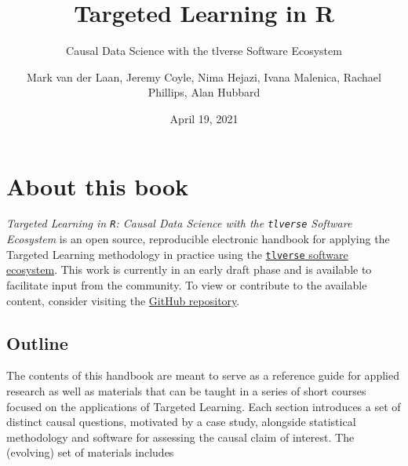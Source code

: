 \documentclass[12pt, krantz2,]{krantz}
\title{Targeted Learning in R}
\subtitle{Causal Data Science with the tlverse Software Ecosystem}
\author{Mark van der Laan, Jeremy Coyle, Nima Hejazi, Ivana Malenica, Rachael Phillips, Alan Hubbard}
\date{April 19, 2021}
\theoremstyle{definition}
\theoremstyle{definition}
\theoremstyle{definition}
\newcommand{\1}{\mathbbm{1}}
\begin{document}
\maketitle


\thispagestyle{empty}

\begin{center}
\end{center}

\setlength{\abovedisplayskip}{-5pt}
\setlength{\abovedisplayshortskip}{-5pt}

\mainmatter

{
\hypersetup{linkcolor=}
\setcounter{tocdepth}{3}
\tableofcontents
}
\listoftables
\listoffigures
\hypertarget{about-this-book}{%
\section*{About this book}\label{about-this-book}}


\emph{Targeted Learning in \texttt{R}: Causal Data Science with the \texttt{tlverse} Software
Ecosystem} is an open source, reproducible electronic handbook for applying the
Targeted Learning methodology in practice using the \href{https://github.com/tlverse}{\texttt{tlverse} software
ecosystem}. This work is currently in an early draft
phase and is available to facilitate input from the community. To view or
contribute to the available content, consider visiting the \href{https://github.com/tlverse/tlverse-handbook}{GitHub
repository}.

\hypertarget{outline}{%
\subsection{Outline}\label{outline}}

The contents of this handbook are meant to serve as a reference guide for
applied research as well as materials that can be taught in a series of short
courses focused on the applications of Targeted Learning. Each section
introduces a set of distinct causal questions, motivated by a case study,
alongside statistical methodology and software for assessing the causal claim of
interest. The (evolving) set of materials includes
\end{document}
